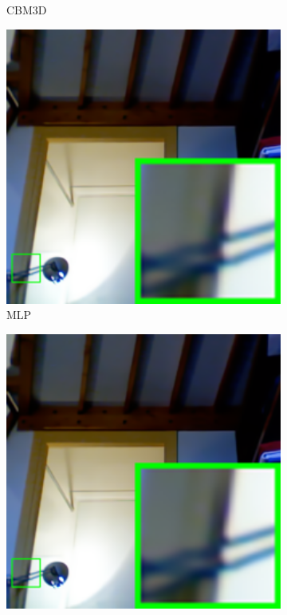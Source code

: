 \begin{figure}
\begin{subfigure}[t]{0.19\textwidth}
		\caption{CBM3D}
    \end{subfigure}
    \hfill
    \begin{subfigure}[t]{0.19\textwidth}
        \centering
        \includegraphics[width=1\textwidth]{images/mcwnnm/nc/resize_br_MLP_room.png}
\caption{MLP}
    \end{subfigure}
    \hfill
    \begin{subfigure}[t]{0.19\textwidth}
        \centering
        \includegraphics[width=1\textwidth]{images/mcwnnm/nc/resize_br_TNRD_room.png}

\end{subfigure}
\end{figure}
